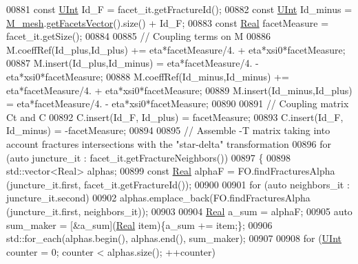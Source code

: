 \begin{DoxyCode}
00881                 \textcolor{keyword}{const} \hyperlink{namespaceFVCode3D_a4bf7e328c75d0fd504050d040ebe9eda}{UInt} Id\_F            = facet\_it.getFractureId();
00882                 \textcolor{keyword}{const} \hyperlink{namespaceFVCode3D_a4bf7e328c75d0fd504050d040ebe9eda}{UInt} Id\_minus        = \hyperlink{classFVCode3D_1_1global__Operator_a027911d0f801f6f19a3006329ec30a7f}{M\_mesh}.\hyperlink{classFVCode3D_1_1Rigid__Mesh_a6d3cdd4ef8a5225599953179d5302636}{getFacetsVector}().size() + 
      Id\_F;
00883                 \textcolor{keyword}{const} \hyperlink{namespaceFVCode3D_a40c1f5588a248569d80aa5f867080e83}{Real} facetMeasure    = facet\_it.getSize();
00884                 
00885                 \textcolor{comment}{// Coupling terms on M}
00886                 M.coeffRef(Id\_plus,Id\_plus)    +=   eta*facetMeasure/4. + eta*xsi0*facetMeasure;
00887                 M.insert(Id\_plus,Id\_minus)      =   eta*facetMeasure/4. - eta*xsi0*facetMeasure;
00888                 M.coeffRef(Id\_minus,Id\_minus)  +=   eta*facetMeasure/4. + eta*xsi0*facetMeasure;
00889                 M.insert(Id\_minus,Id\_plus)      =   eta*facetMeasure/4. - eta*xsi0*facetMeasure;
00890                 
00891                 \textcolor{comment}{// Coupling matrix Ct and C}
00892                 C.insert(Id\_F, Id\_plus)     =  facetMeasure;
00893                 C.insert(Id\_F, Id\_minus)    = -facetMeasure;
00894         
00895                 \textcolor{comment}{// Assemble -T matrix taking into account fractures intersections with the "star-delta"
       transformation}
00896         \textcolor{keywordflow}{for} (\textcolor{keyword}{auto} juncture\_it : facet\_it.getFractureNeighbors())
00897         \{       
00898             std::vector<Real> alphas;
00899             \textcolor{keyword}{const} \hyperlink{namespaceFVCode3D_a40c1f5588a248569d80aa5f867080e83}{Real} alphaF = FO.findFracturesAlpha (juncture\_it.first, facet\_it.getFractureId());
00900 
00901             \textcolor{keywordflow}{for} (\textcolor{keyword}{auto} neighbors\_it : juncture\_it.second)
00902                 alphas.emplace\_back(FO.findFracturesAlpha (juncture\_it.first, neighbors\_it));
00903 
00904             \hyperlink{namespaceFVCode3D_a40c1f5588a248569d80aa5f867080e83}{Real} a\_sum = alphaF;
00905             \textcolor{keyword}{auto} sum\_maker = [&a\_sum](\hyperlink{namespaceFVCode3D_a40c1f5588a248569d80aa5f867080e83}{Real} item)\{a\_sum += item;\};
00906             std::for\_each(alphas.begin(), alphas.end(), sum\_maker);
00907 
00908             \textcolor{keywordflow}{for} (\hyperlink{namespaceFVCode3D_a4bf7e328c75d0fd504050d040ebe9eda}{UInt} counter = 0; counter < alphas.size(); ++counter)

\end{DoxyCode}
